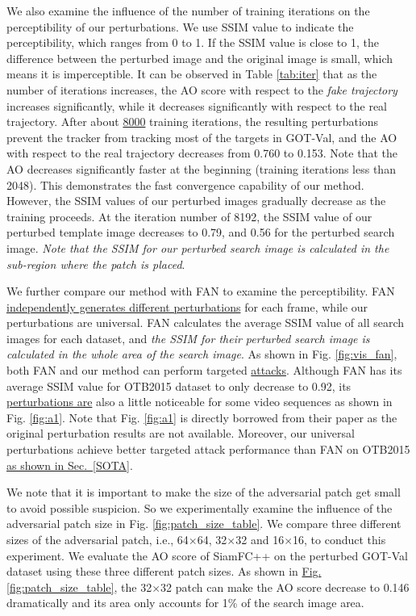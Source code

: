\documentclass[journal]{IEEEtran}
\newcommand{\ie}{i.e.}
\begin{document}
We also examine the influence of the number of training iterations on the perceptibility of our perturbations. We use SSIM value to indicate the perceptibility, which ranges from 0 to 1. If the SSIM value is close to 1, the difference between the perturbed image and the original image is small, which means it is imperceptible. It can be observed in Table \ref{tab:iter} that as the number of iterations increases, the AO score with respect to the \textit{fake trajectory} increases significantly, while it decreases significantly with respect to the real trajectory. After about \uline{8000} training iterations, the resulting perturbations prevent the tracker from tracking most of the targets in GOT-Val, and the AO with respect to the real trajectory decreases from 0.760 to 0.153. Note that the AO decreases significantly faster at the beginning (training iterations less than 2048). This demonstrates the fast convergence capability of our method. However, the SSIM values of our perturbed images gradually decrease as the training proceeds. At the iteration number of 8192, the SSIM value of our perturbed template image decreases to 0.79, and 0.56 for the perturbed search image. \textit{Note that the SSIM for our perturbed search image is calculated in the sub-region where the patch is placed}.

We further compare our method with FAN \cite{FAN} to examine the perceptibility. FAN \uline{independently generates different perturbations} for each frame, while our perturbations are universal. FAN calculates the average SSIM value of all search images for each dataset, and \textit{the SSIM for their perturbed search image is calculated in the whole area of the search image}. As shown in Fig. \ref{fig:vis_fan}, both FAN and our method can perform targeted \uline{attacks}. Although FAN has its average SSIM value for OTB2015 dataset to only decrease to 0.92, its \uline{perturbations are} also a little noticeable for some video sequences as shown in Fig. \ref{fig:a1}. Note that Fig. \ref{fig:a1} is directly borrowed from their paper as the original perturbation results are not available. Moreover, our universal perturbations achieve better targeted attack performance than FAN on OTB2015 \uline{as shown in Sec.~\ref{SOTA}}.

We note that it is important to make the size of the adversarial patch get small to avoid possible suspicion. So we experimentally examine the influence of the adversarial patch size in Fig. \ref{fig:patch_size_table}. We compare three different sizes of the adversarial patch, \ie, 64$\times$64, 32$\times$32 and 16$\times$16, to conduct this experiment. We evaluate the AO score of SiamFC++ on the perturbed GOT-Val dataset using these three different patch sizes.
As shown in \uline{Fig.} \ref{fig:patch_size_table}, the 32$\times$32 patch can make the AO score decrease to 0.146 dramatically and its area only accounts for 1\% of the search image area.
\end{document}
